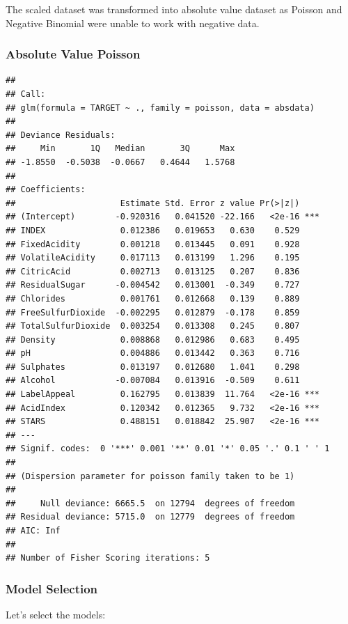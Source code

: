 \documentclass[]{elsarticle} %
\begin{document}
The scaled dataset was transformed into absolute value dataset as
Poisson and Negative Binomial were unable to work with negative data.

\hypertarget{absolute-value-poisson}{%
\subsubsection{Absolute Value Poisson}\label{absolute-value-poisson}}

\begin{verbatim}
## 
## Call:
## glm(formula = TARGET ~ ., family = poisson, data = absdata)
## 
## Deviance Residuals: 
##     Min       1Q   Median       3Q      Max  
## -1.8550  -0.5038  -0.0667   0.4644   1.5768  
## 
## Coefficients:
##                     Estimate Std. Error z value Pr(>|z|)    
## (Intercept)        -0.920316   0.041520 -22.166   <2e-16 ***
## INDEX               0.012386   0.019653   0.630    0.529    
## FixedAcidity        0.001218   0.013445   0.091    0.928    
## VolatileAcidity     0.017113   0.013199   1.296    0.195    
## CitricAcid          0.002713   0.013125   0.207    0.836    
## ResidualSugar      -0.004542   0.013001  -0.349    0.727    
## Chlorides           0.001761   0.012668   0.139    0.889    
## FreeSulfurDioxide  -0.002295   0.012879  -0.178    0.859    
## TotalSulfurDioxide  0.003254   0.013308   0.245    0.807    
## Density             0.008868   0.012986   0.683    0.495    
## pH                  0.004886   0.013442   0.363    0.716    
## Sulphates           0.013197   0.012680   1.041    0.298    
## Alcohol            -0.007084   0.013916  -0.509    0.611    
## LabelAppeal         0.162795   0.013839  11.764   <2e-16 ***
## AcidIndex           0.120342   0.012365   9.732   <2e-16 ***
## STARS               0.488151   0.018842  25.907   <2e-16 ***
## ---
## Signif. codes:  0 '***' 0.001 '**' 0.01 '*' 0.05 '.' 0.1 ' ' 1
## 
## (Dispersion parameter for poisson family taken to be 1)
## 
##     Null deviance: 6665.5  on 12794  degrees of freedom
## Residual deviance: 5715.0  on 12779  degrees of freedom
## AIC: Inf
## 
## Number of Fisher Scoring iterations: 5
\end{verbatim}

\hypertarget{model-selection}{%
\subsubsection{Model Selection}\label{model-selection}}

Let's select the models:
\end{document}
